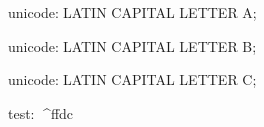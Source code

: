 

unicode:^^^LATIN CAPITAL LETTER A;

unicode:^^^LATIN CAPITAL LETTER B;

unicode:^^^LATIN CAPITAL LETTER C;

test: ^^^^ffdc %
